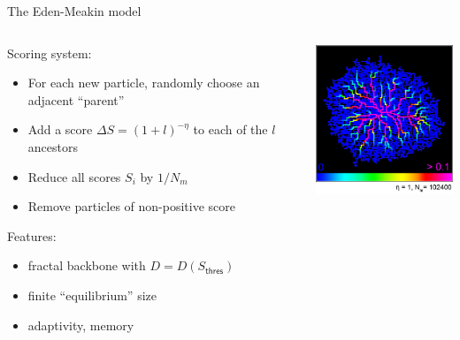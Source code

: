 \documentclass[smaller]{beamer}
\begin{document}
            \begin{frame}{The Eden-Meakin model}
                \begin{columns}
                    \begin{column}{6cm}
                        {
                            Scoring system:
                            \begin{itemize}
                                \item For each new particle, randomly choose an adjacent ``parent''
                                \item Add a score $\Delta S=(1+l)^{-\eta}$ to each of the $l$ ancestors
                                \item Reduce all scores $S_i$ by $1/N_m$
                                \item Remove particles of non-positive score
                            \end{itemize}
                        }
                        {
                            Features:
                            \begin{itemize}
                                \item fractal backbone with $D=D(S_\mathsf{thres})$
                                \item finite ``equilibrium'' size
                                \item adaptivity, memory
                            \end{itemize}
                        }
                    \end{column}
                    \begin{column}{5cm}
                        \includegraphics[width = 5cm]{img/eden_02.png}
                    \end{column}
                \end{columns}
            \end{frame}
\end{document}
